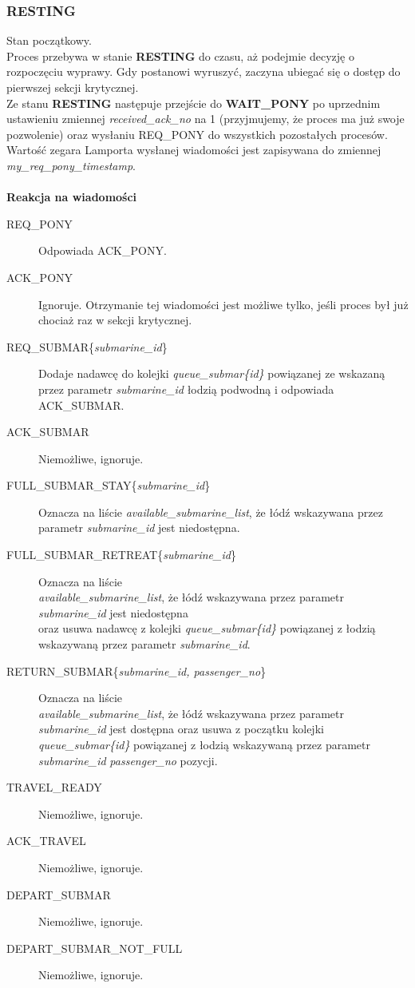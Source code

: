 \documentclass[a4paper]{article}
\begin{document}
\subsubsection{\textbf{RESTING}}
Stan początkowy. \\
Proces przebywa w stanie \textbf{RESTING} do czasu, aż podejmie decyzję o rozpoczęciu wyprawy.
Gdy postanowi wyruszyć, zaczyna ubiegać się o dostęp do pierwszej sekcji krytycznej. \\
Ze stanu \textbf{RESTING} następuje przejście do \textbf{WAIT\_PONY} po uprzednim
ustawieniu zmiennej \textit{received\_ack\_no} na 1 (przyjmujemy, że proces ma już swoje pozwolenie)
oraz wysłaniu REQ\_PONY do wszystkich pozostałych procesów.
Wartość zegara Lamporta wysłanej wiadomości jest zapisywana do zmiennej \textit{my\_req\_pony\_timestamp}.
\\
\\
\textbf{Reakcja na wiadomości}
\begin{description}
    \item [REQ\_PONY] Odpowiada ACK\_PONY.
    \item [ACK\_PONY] Ignoruje. Otrzymanie tej wiadomości jest możliwe tylko, jeśli proces był już chociaż raz w sekcji krytycznej.
    \item [REQ\_SUBMAR\{\textit{submarine\_id}\}] Dodaje nadawcę do kolejki \textit{queue\_submar\{id\}} powiązanej ze wskazaną przez parametr \textit{submarine\_id} łodzią podwodną i odpowiada ACK\_SUBMAR.
    \item [ACK\_SUBMAR] Niemożliwe, ignoruje.
    \item [FULL\_SUBMAR\_STAY\{\textit{submarine\_id}\}] Oznacza na liście \textit{available\_submarine\_list}, że łódź wskazywana przez parametr \textit{submarine\_id} jest niedostępna.
    \item [FULL\_SUBMAR\_RETREAT\{\textit{submarine\_id}\}] Oznacza na liście\\
     \textit{available\_submarine\_list}, że łódź wskazywana przez parametr \textit{submarine\_id} jest niedostępna \\oraz usuwa nadawcę z kolejki \textit{queue\_submar\{id\}} powiązanej z łodzią wskazywaną przez parametr \textit{submarine\_id}.
    \item [RETURN\_SUBMAR\{\textit{submarine\_id, passenger\_no}\}] Oznacza na liście\\ \textit{available\_submarine\_list}, że łódź wskazywana przez parametr \textit{submarine\_id} jest dostępna
    oraz usuwa z początku kolejki \textit{queue\_submar\{id\}} powiązanej z łodzią wskazywaną przez parametr \textit{submarine\_id} \textit{passenger\_no} pozycji.
    \item [TRAVEL\_READY] Niemożliwe, ignoruje.
    \item [ACK\_TRAVEL] Niemożliwe, ignoruje.
    \item [DEPART\_SUBMAR] Niemożliwe, ignoruje.
    \item [DEPART\_SUBMAR\_NOT\_FULL] Niemożliwe, ignoruje.
\end{description}
\end{document}
